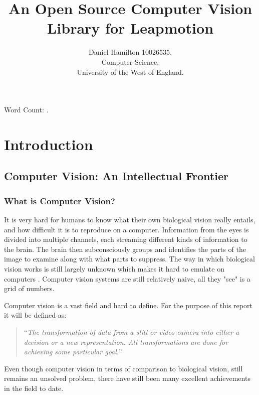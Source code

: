 \documentclass[11pt,oneside]{report}
\title{An Open Source Computer Vision Library for Leapmotion}
\author{Daniel Hamilton 10026535,\\Computer Science,\\University of the West of England.}
\begin{document}
	\maketitle
	\tableofcontents

	
	Word Count: \bashStdout.
	\begin{abstract}
	
	\end{abstract}	
	\chapter{Introduction}
		\section{Computer Vision: An Intellectual Frontier}
			\subsection{What is Computer Vision?}		
				
				It is very hard for humans to know what their own biological vision really entails, and how difficult it is to reproduce on a computer.
				Information from the eyes is divided into multiple channels, each streaming different kinds of information to the brain.
				The brain then subconsciously groups and identifies the parts of the image to examine along with what parts to suppress.
				The way in which biological vision works is still largely unknown which makes it hard to emulate on computers \cite[p. xi]{book:multiViewGeo}.				
				Computer vision systems are still relatively naive, all they "see" is a grid of numbers.%
				
				
				Computer vision is a vast field and hard to define.
				For the purpose of this report it will be defined as:
	
				\begin{quote}
					``\textit{The transformation of data from a still or video camera into either a decision or a new representation.
						All transformations are done for achieving some particular goal.}'' \cite[p. 2]{definition:cv}
				\end{quote}
				
				Even though computer vision in terms of comparison to biological vision, still remains an unsolved problem, there have still been many excellent achievements in the field to date.
\end{document}

